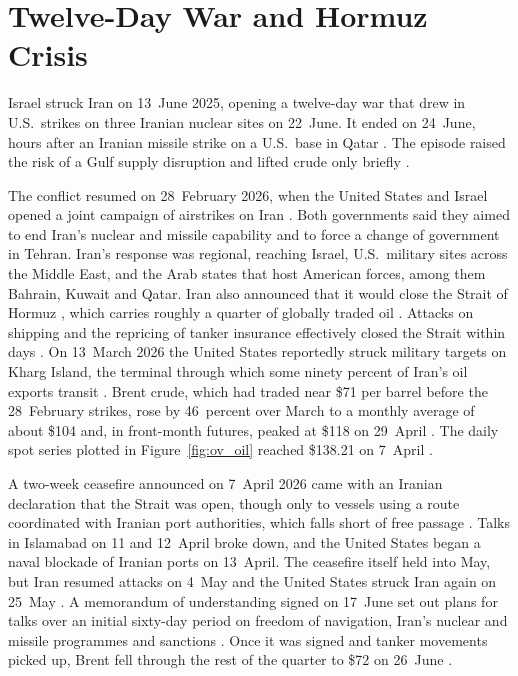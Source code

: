 \section{Twelve-Day War and Hormuz Crisis}
\label{sec:bg_iran}

Israel struck Iran on 13~June 2025, opening a twelve-day war that drew in U.S.\ strikes on three Iranian nuclear sites on 22~June. It ended on 24~June, hours after an Iranian missile strike on a U.S.\ base in Qatar \parencite{crs_2025_israel_iran}. The episode raised the risk of a Gulf supply disruption and lifted crude only briefly \parencite{kilian_plante_richter_zhou_2026,eia_2026_crude}.

The conflict resumed on 28~February 2026, when the United States and Israel opened a joint campaign of airstrikes on Iran \parencite{crs_2026_iran_conflict}. Both governments said they aimed to end Iran's nuclear and missile capability and to force a change of government in Tehran. Iran's response was regional, reaching Israel, U.S.\ military sites across the Middle East, and the Arab states that host American forces, among them Bahrain, Kuwait and Qatar. Iran also announced that it would close the Strait of Hormuz \parencite{hoc_2026_conflict}, which carries roughly a quarter of globally traded oil \parencite{fattouh_economou_2026}. Attacks on shipping and the repricing of tanker insurance effectively closed the Strait within days \parencite{kilian_plante_richter_zhou_2026}. On 13~March 2026 the United States reportedly struck military targets on Kharg Island, the terminal through which some ninety percent of Iran's oil exports transit \parencite{crs_2026_iran_conflict}. Brent crude, which had traded near \$71 per barrel before the 28~February strikes, rose by 46~percent over March to a monthly average of about \$104 and, in front-month futures, peaked at \$118 on 29~April \parencite{fattouh_economou_2026,imf_2026_menap,eia_2026_hormuz}. The daily spot series plotted in Figure~\ref{fig:ov_oil} reached \$138.21 on 7~April \parencite{ds_eia_energy}.

A two-week ceasefire announced on 7~April 2026 came with an Iranian declaration that the Strait was open, though only to vessels using a route coordinated with Iranian port authorities, which falls short of free passage \parencite{fattouh_economou_2026}. Talks in Islamabad on 11 and 12~April broke down, and the United States began a naval blockade of Iranian ports on 13~April. The ceasefire itself held into May, but Iran resumed attacks on 4~May and the United States struck Iran again on 25~May \parencite{crs_2026_ceasefire,cnn_2026_strikes}. A memorandum of understanding signed on 17~June set out plans for talks over an initial sixty-day period on freedom of navigation, Iran's nuclear and missile programmes and sanctions \parencite{hoc_2026_ceasefire}. Once it was signed and tanker movements picked up, Brent fell through the rest of the quarter to \$72 on 26~June \parencite{eia_2026_hormuz}.

